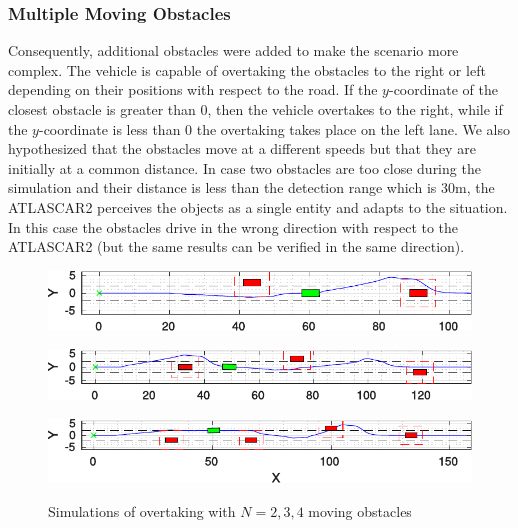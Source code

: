 \documentclass[conference, 11pt]{IEEEtran}
\begin{document}
\subsubsection{Multiple Moving Obstacles}
Consequently, additional obstacles were added to make the scenario more complex. The vehicle is capable of overtaking the obstacles to the right or left depending on their positions with respect to the road. If the $y$-coordinate of the closest obstacle is greater than 0, then the vehicle overtakes to the right, while if the $y$-coordinate is less than 0 the overtaking takes place on the left lane. We also hypothesized that the obstacles move at a different speeds but that they are initially at a common distance. In case two obstacles are too close during the simulation and their distance is less than the detection range which is $30$m, the ATLASCAR2 perceives the objects as a single entity and adapts to the situation. In this case the obstacles drive in the wrong direction with respect to the ATLASCAR2 (but the same results can be verified in the same direction).
\begin{figure}[!h]
	\centering
	\begin{minipage}[t]{\columnwidth}
	\includegraphics[width=1\columnwidth]{../../MATLAB/random_N_obstacles/figure/overtaking_random_2.pdf}
	\label{fig:obstacleAvoidance_random_2}
	\end{minipage}
	\begin{minipage}[t]{\columnwidth}
	\includegraphics[width=1\columnwidth]{../../MATLAB/random_N_obstacles/figure/overtaking_random.pdf}
	\label{fig:obstacleAvoidance_random}
	\end{minipage}
	\begin{minipage}[t]{\columnwidth}
	\includegraphics[width=1\columnwidth]{../../MATLAB/random_N_obstacles/figure/overtaking_random_1.pdf}
	\label{fig:obstacleAvoidance_random_1}
	\end{minipage}
	\caption{Simulations of overtaking with $N = 2,3,4$ moving obstacles}
\end{figure}
\end{document}
